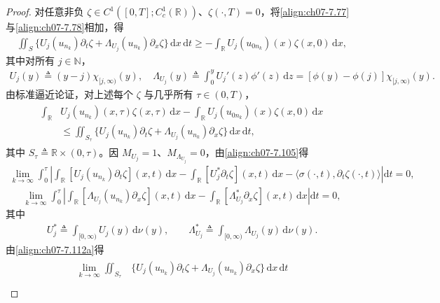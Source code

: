 \documentclass[../../main.tex]{subfiles}%
\begin{document}
\begin{proof}
对任意非负 $\zeta\in C^1([0,T];C^1_c(\mathbb{R}))$、$\zeta(\cdot,T)=0$，将\eqref{align:ch07-7.77}与\eqref{align:ch07-7.78}相加，得
\begin{align*}
\iint_S\{U_j(u_{n_k})\partial_t\zeta+\Lambda_{U_j}(u_{n_k})\partial_x\zeta\}\,\mathrm{d}x\,\mathrm{d}t
\geqslant-\int_{\mathbb{R}}U_j(u_{0n_k})(x)\zeta(x,0)\,\mathrm{d}x,
\end{align*}
其中对所有 $j\in\mathbb{N}$，
\begin{align}
U_j(y)\triangleq (y-j)\chi_{[j,\infty)}(y),\quad
\Lambda_{U_j}(y)\triangleq \int_0^y U_j'(z)\phi'(z)\,\mathrm{d}z=[\phi(y)-\phi(j)]\chi_{[j,\infty)}(y). \label{align:ch07-7.110}
\end{align}
由标准逼近论证，对上述每个 $\zeta$ 与几乎所有 $\tau\in(0,T)$，
\begin{align}
\begin{aligned}
\int_{\mathbb{R}}&U_j(u_{n_k})(x,\tau)\zeta(x,\tau)\,\mathrm{d}x-\int_{\mathbb{R}}U_j(u_{0n_k})(x)\zeta(x,0)\,\mathrm{d}x\\
&\leqslant\iint_{S_\tau}\{U_j(u_{n_k})\partial_t\zeta+\Lambda_{U_j}(u_{n_k})\partial_x\zeta\}\,\mathrm{d}x\,\mathrm{d}t,
\end{aligned} \label{align:ch07-7.111}
\end{align}
其中 $S_\tau\triangleq \mathbb{R}\times(0,\tau)$。因 $M_{U_j}=1$、$M_{\Lambda_{U_j}}=0$，由\eqref{align:ch07-7.105}得
\begin{align}
\lim_{k\to\infty}\int_0^\tau\left|\int_{\mathbb{R}}[U_j(u_{n_k})\partial_t\zeta](x,t)\,\mathrm{d}x
-\int_{\mathbb{R}}[U_j^*\partial_t\zeta](x,t)\,\mathrm{d}x
-\langle\sigma(\cdot,t),\partial_t\zeta(\cdot,t)\rangle\right|\mathrm{d}t=0, \label{align:ch07-7.112a}
\end{align}
\begin{align}
\lim_{k\to\infty}\int_0^\tau\left|\int_{\mathbb{R}}[\Lambda_{U_j}(u_{n_k})\partial_x\zeta](x,t)\,\mathrm{d}x
-\int_{\mathbb{R}}[\Lambda_{U_j}^*\partial_x\zeta](x,t)\,\mathrm{d}x\right|\mathrm{d}t=0, \label{align:ch07-7.112b}
\end{align}
其中
\begin{align*}
U_j^*\triangleq \int_{[0,\infty)}U_j(y)\,\mathrm{d}\nu(y),\qquad
\Lambda_{U_j}^*\triangleq \int_{[0,\infty)}\Lambda_{U_j}(y)\,\mathrm{d}\nu(y).
\end{align*}
由\eqref{align:ch07-7.112a}得
\begin{align}
\begin{aligned}
\lim_{k\to\infty}\iint_{S_\tau}&\{U_j(u_{n_k})\partial_t\zeta+\Lambda_{U_j}(u_{n_k})\partial_x\zeta\}\,\mathrm{d}x\,\mathrm{d}t\\

\end{aligned}
\end{align}
\end{proof}
\end{document}
